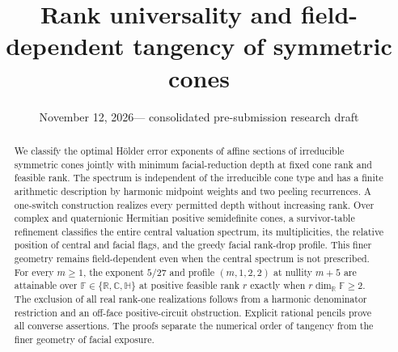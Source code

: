 \documentclass[11pt,reqno]{amsart}
\title[Rank universality and field-dependent tangency]{Rank universality and field-dependent tangency of symmetric cones}
\date{November 12, 2026\quad\textnormal{--- consolidated pre-submission research draft}}
\numberwithin{equation}{section}
\theoremstyle{definition}
\theoremstyle{remark}
\newcommand{\R}{\mathbb R}
\newcommand{\C}{\mathbb C}
\newcommand{\HH}{\mathbb H}
\newcommand{\F}{\mathbb F}
\begin{document}
\begin{abstract}
We classify the optimal H\"older error exponents of affine sections of irreducible symmetric cones jointly with minimum facial-reduction depth at fixed cone rank and feasible rank. The spectrum is independent of the irreducible cone type and has a finite arithmetic description by harmonic midpoint weights and two peeling recurrences. A one-switch construction realizes every permitted depth without increasing rank. Over complex and quaternionic Hermitian positive semidefinite cones, a survivor-table refinement classifies the entire central valuation spectrum, its multiplicities, the relative position of central and facial flags, and the greedy facial rank-drop profile. This finer geometry remains field-dependent even when the central spectrum is not prescribed. For every $m\ge1$, the exponent $5/27$ and profile $(m,1,2,2)$ at nullity $m+5$ are attainable over $\F\in\{\R,\C,\HH\}$ at positive feasible rank $r$ exactly when $r\dim_{\R}\F\ge2$. The exclusion of all real rank-one realizations follows from a harmonic denominator restriction and an off-face positive-circuit obstruction. Explicit rational pencils prove all converse assertions. The proofs separate the numerical order of tangency from the finer geometry of facial exposure.
\end{abstract}
\maketitle
\tableofcontents






\appendix



\end{document}
